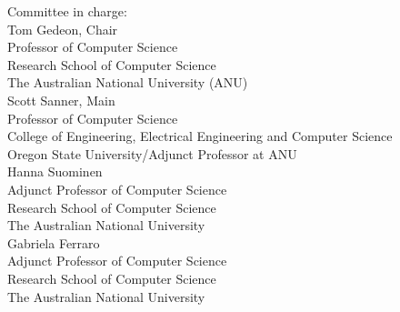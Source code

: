 \noindent
{\Huge{Committee in charge:} }\\[.4cm]
{\LARGE  Tom Gedeon, Chair } \\[.1cm]
{Professor of Computer Science\\
Research School of Computer Science\\
The Australian National University (ANU)
 }\\[.2cm]
{\LARGE  Scott Sanner, Main } \\[.1cm]
{Professor of Computer Science\\
College of Engineering,
Electrical Engineering and Computer Science\\
Oregon State University/Adjunct Professor at ANU
 }\\[.2cm]
{\LARGE  Hanna Suominen } \\[.1cm]
{Adjunct Professor of Computer Science\\
Research School of Computer Science\\
The Australian National University
}\\[.2cm]
{\LARGE  Gabriela Ferraro } \\[.1cm]
{Adjunct Professor of Computer Science\\
Research School of Computer Science\\
The Australian National University
}\\[.2cm]



\newpage
%
%
%
